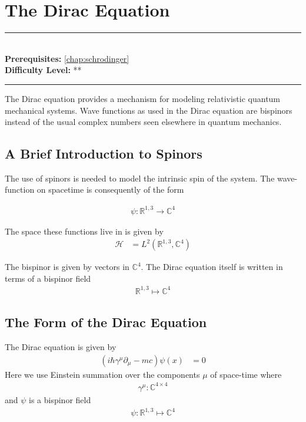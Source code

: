 \documentclass[book.tex]{subfiles}
\begin{document}
\chapter{The Dirac Equation}

\label{chap:dirac_equation}
\noindent\rule{11cm}{0.4pt} \\
\textbf{Prerequisites:}  \autoref{chap:schrodinger} \\
\textbf{Difficulty Level:} ** \\
\noindent\rule{11cm}{0.4pt}
\vspace{5mm}

The Dirac equation provides a mechanism for modeling relativistic quantum mechanical systems. Wave functions as used in the Dirac equation are bispinors instead of the usual complex numbers seen elsewhere in quantum mechanics.

\section{A Brief Introduction to Spinors}

The use of spinors is needed to model the intrinsic spin of the system. The wave-function on spacetime is consequently of the form

\begin{align}
    \psi: \mathbb{R}^{1, 3} \to \mathbb{C}^4
\end{align}

The space these functions live in is given by 
\begin{align}
    \mathcal{H} &= L^2(\mathbb{R}^{1, 3}, \mathbb{C}^4)
\end{align}

The bispinor is given by vectors in $\mathbb{C}^4$. The Dirac equation itself is written in terms of a bispinor field 
\begin{align}
    \mathbb{R}^{1,3} \mapsto \mathbb{C}^4
\end{align}

\section{The Form of the Dirac Equation}
The Dirac equation is given by
\begin{align}
    (i \hbar \gamma^{\mu} \partial_{\mu}  - m c) \psi(x) &= 0
\end{align}
Here we use Einstein summation over the components $\mu$ of space-time where 
\begin{align}
\gamma^{\mu} : \mathbb{C}^{4\times 4}
\end{align}
and $\psi$ is a bispinor field
\begin{align}
    \psi: \mathbb{R}^{1,3} \mapsto \mathbb{C}^4
\end{align}
\end{document}
